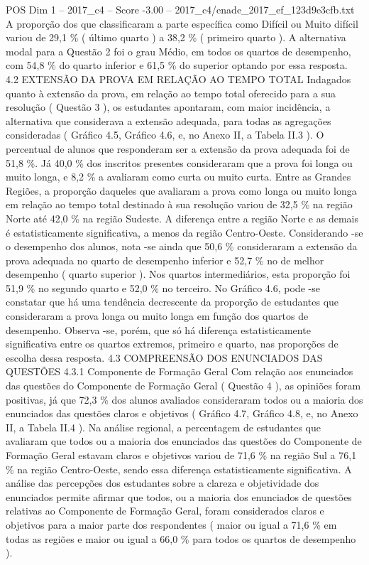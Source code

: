 \begin{textsample}{POS Dim 1 – 2017\_c4 – Score -3.00 – 2017\_c4/enade\_2017\_ef\_123d9e3cfb.txt}
A proporção dos que classificaram a parte específica como Difícil ou Muito difícil variou de 29,1 \% ( último quarto ) a 38,2 \% ( primeiro quarto ).
A alternativa modal para a Questão 2 foi o grau Médio, em todos os quartos de desempenho, com 54,8 \% do quarto inferior e 61,5 \% do superior optando por essa resposta. 4.2 EXTENSÃO DA PROVA EM RELAÇÃO AO TEMPO TOTAL Indagados quanto à extensão da prova, em relação ao tempo total oferecido para a sua resolução ( Questão 3 ), os estudantes apontaram, com maior incidência, a alternativa que considerava a extensão adequada, para todas as agregações consideradas ( Gráfico 4.5, Gráfico 4.6, e, no Anexo II, a Tabela II.3 ).
O percentual de alunos que responderam ser a extensão da prova adequada foi de 51,8 \%.
Já 40,0 \% dos inscritos presentes consideraram que a prova foi longa ou muito longa, e 8,2 \% a avaliaram como curta ou muito curta.
Entre as Grandes Regiões, a proporção daqueles que avaliaram a prova como longa ou muito longa em relação ao tempo total destinado à sua resolução variou de 32,5 \% na região Norte até 42,0 \% na região Sudeste.
A diferença entre a região Norte e as demais é estatisticamente significativa, a menos da região Centro-Oeste.
Considerando -se o desempenho dos alunos, nota -se ainda que 50,6 \% consideraram a extensão da prova adequada no quarto de desempenho inferior e 52,7 \% no de melhor desempenho ( quarto superior ).
Nos quartos intermediários, esta proporção foi 51,9 \% no segundo quarto e 52,0 \% no terceiro.
No Gráfico 4.6, pode -se constatar que há uma tendência decrescente da proporção de estudantes que consideraram a prova longa ou muito longa em função dos quartos de desempenho.
Observa -se, porém, que só há diferença estatisticamente significativa entre os quartos extremos, primeiro e quarto, nas proporções de escolha dessa resposta. 4.3 COMPREENSÃO DOS ENUNCIADOS DAS QUESTÕES 4.3.1 Componente de Formação Geral Com relação aos enunciados das questões do Componente de Formação Geral ( Questão 4 ), as opiniões foram positivas, já que 72,3 \% dos alunos avaliados consideraram todos ou a maioria dos enunciados das questões claros e objetivos ( Gráfico 4.7, Gráfico 4.8, e, no Anexo II, a Tabela II.4 ).
Na análise regional, a percentagem de estudantes que avaliaram que todos ou a maioria dos enunciados das questões do Componente de Formação Geral estavam claros e objetivos variou de 71,6 \% na região Sul a 76,1 \% na região Centro-Oeste, sendo essa diferença estatisticamente significativa.
A análise das percepções dos estudantes sobre a clareza e objetividade dos enunciados permite afirmar que todos, ou a maioria dos enunciados de questões relativas ao Componente de Formação Geral, foram considerados claros e objetivos para a maior parte dos respondentes ( maior ou igual a 71,6 \% em todas as regiões e maior ou igual a 66,0 \% para todos os quartos de desempenho ).

\end{textsample}
